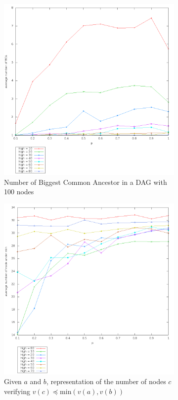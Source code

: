 \begin{figure}[H]
  \centering
 \begin{subfigure}[b]{0.49 \textwidth}
  \includegraphics[width = \textwidth]{./image/resultprelim/averagenbbca.png}
  \caption{Number of Biggest Common Ancestor in a DAG with 100 nodes} \label{fig:nbbca}
 \end{subfigure}
 \begin{subfigure}[b]{0.49 \textwidth}
  \includegraphics[width = \textwidth]{./image/resultprelim/averagenum.png}
  \caption{Given $a$ and $b$, representation of the number of nodes $c$ verifying $v(c) \preccurlyeq \mathrm{min}(v(a),v(b))$} \label{fig:num}
 \end{subfigure}
 \caption{}
\end{figure}

